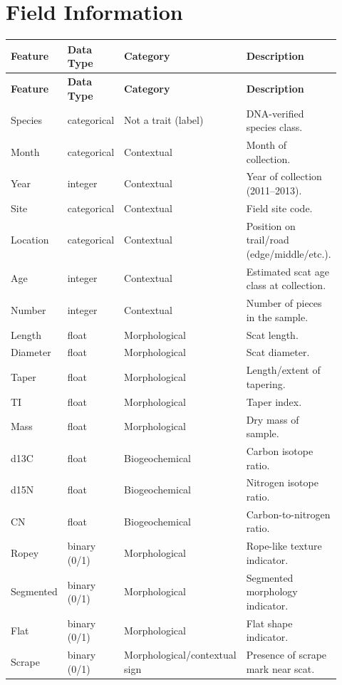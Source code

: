 \documentclass[11pt,a4paper]{article}
\begin{document}
\section*{Field Information}
\begin{longtable}{@{}p{0.16\linewidth}p{0.13\linewidth}p{0.2\linewidth}p{0.43\linewidth}@{}}
\toprule
\textbf{Feature} & \textbf{Data Type} & \textbf{Category} & \textbf{Description} \\
\midrule
\endfirsthead
\toprule
\textbf{Feature} & \textbf{Data Type} & \textbf{Category} & \textbf{Description} \\
\midrule
\endhead
Species & categorical & Not a trait (label) & DNA-verified species class. \\
Month & categorical & Contextual & Month of collection. \\
Year & integer & Contextual & Year of collection (2011--2013). \\
Site & categorical & Contextual & Field site code. \\
Location & categorical & Contextual & Position on trail/road (edge/middle/etc.). \\
Age & integer & Contextual & Estimated scat age class at collection. \\
Number & integer & Contextual & Number of pieces in the sample. \\
Length & float & Morphological & Scat length. \\
Diameter & float & Morphological & Scat diameter. \\
Taper & float & Morphological & Length/extent of tapering. \\
TI & float & Morphological & Taper index. \\
Mass & float & Morphological & Dry mass of sample. \\
d13C & float & Biogeochemical & Carbon isotope ratio. \\
d15N & float & Biogeochemical & Nitrogen isotope ratio. \\
CN & float & Biogeochemical & Carbon-to-nitrogen ratio. \\
Ropey & binary (0/1) & Morphological & Rope-like texture indicator. \\
Segmented & binary (0/1) & Morphological & Segmented morphology indicator. \\
Flat & binary (0/1) & Morphological & Flat shape indicator. \\
Scrape & binary (0/1) & Morphological/contextual sign & Presence of scrape mark near scat. \\
\bottomrule
\end{longtable}
\end{document}
